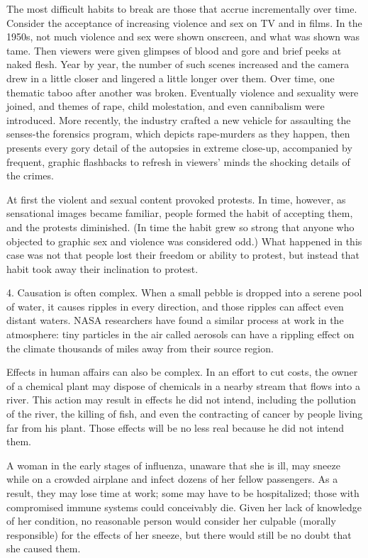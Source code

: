 \documentclass{book}
\begin{document}
The most difficult habits to break are those that accrue incrementally over time. Consider the acceptance of increasing violence and sex on TV and in films. In the 1950s, not much violence and sex were shown onscreen, and what was shown was tame. Then viewers were given glimpses of blood and gore and brief peeks at naked flesh. Year by year, the number of such scenes increased and the camera drew in a little closer and lingered a little longer over them. Over time, one thematic taboo after another was broken. Eventually violence and sexuality were joined, and themes of rape, child molestation, and even cannibalism were introduced. More recently, the industry crafted a new vehicle for assaulting the senses-the forensics program, which depicts rape-murders as they happen, then presents every gory detail of the autopsies in extreme close-up, accompanied by frequent, graphic flashbacks to refresh in viewers’ minds the shocking details of the crimes.

At first the violent and sexual content provoked protests. In time, however, as sensational images became familiar, people formed the habit of accepting them, and the protests diminished. (In time the habit grew so strong that anyone who objected to graphic sex and violence was considered odd.) What happened in this case was not that people lost their freedom or ability to protest, but instead that habit took away their inclination to protest.

4. Causation is often complex. When a small pebble is dropped into a serene pool of water, it causes ripples in every direction, and those ripples can affect even distant waters. NASA researchers have found a similar process at work in the atmosphere: tiny particles in the air called aerosols can have a rippling effect on the climate thousands of miles away from their source region.

Effects in human affairs can also be complex. In an effort to cut costs, the owner of a chemical plant may dispose of chemicals in a nearby stream that flows into a river. This action may result in effects he did not intend, including the pollution of the river, the killing of fish, and even the contracting of cancer by people living far from his plant. Those effects will be no less real because he did not intend them.

A woman in the early stages of influenza, unaware that she is ill, may sneeze while on a crowded airplane and infect dozens of her fellow passengers. As a result, they may lose time at work; some may have to be hospitalized; those with compromised immune systems could conceivably die. Given her lack of knowledge of her condition, no reasonable person would consider her culpable (morally responsible) for the effects of her sneeze, but there would still be no doubt that she caused them.
\end{document}
